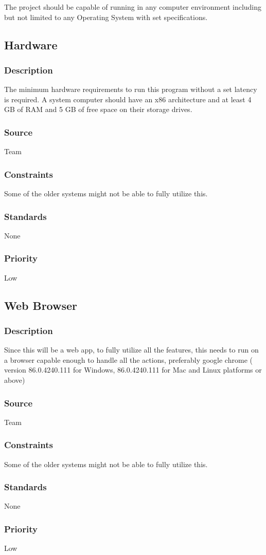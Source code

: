The project should be capable of running in any computer environment including but not limited to any Operating System with set specifications.
\subsection{Hardware}
\subsubsection{Description}
The minimum hardware requirements to run this program without a set latency is required. A system computer should have an x86 architecture and at least 4 GB of RAM and 5 GB of free space on their storage drives. 
\subsubsection{Source}
Team
\subsubsection{Constraints}
Some of the older systems might not be able to fully utilize this.
\subsubsection{Standards}
None
\subsubsection{Priority}
Low

\subsection{Web Browser}
\subsubsection{Description}
Since this will be a web app, to fully utilize all the features, this needs to run on a browser capable enough to handle all the actions, preferably google chrome ( version 86.0.4240.111 for Windows, 86.0.4240.111 for Mac and Linux platforms or above)
\subsubsection{Source}
Team
\subsubsection{Constraints}
Some of the older systems might not be able to fully utilize this.
\subsubsection{Standards}
None
\subsubsection{Priority}
Low